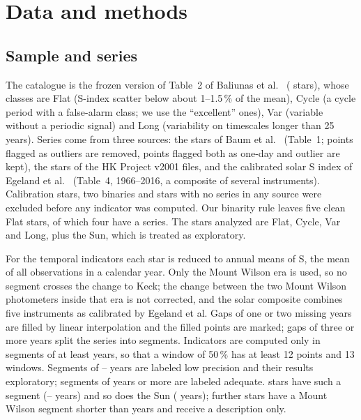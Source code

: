 \section{Data and methods}

\subsection{Sample and series}

The catalogue is the frozen version of Table~2 of Baliunas et al.\ \cite{baliunas1995} (\NCatalog{} stars), whose classes are Flat (S-index scatter below about 1--1.5\,\% of the mean), Cycle (a cycle period with a false-alarm class; we use the ``excellent'' ones), Var (variable without a periodic signal) and Long (variability on timescales longer than 25 years). Series come from three sources: the \NBaumStars{} stars of Baum et al.\ \cite{baum2022} (Table~1; points flagged as outliers are removed, points flagged both as one-day and outlier are kept), the \NVTwoStars{} stars of the HK Project v2001 files, and the calibrated solar S index of Egeland et al.\ \cite{egeland2017} (Table~4, 1966--2016, a composite of several instruments). Calibration stars, two binaries and stars with no series in any source were excluded before any indicator was computed. Our binarity rule leaves five clean Flat stars, of which four have a series. The stars analyzed are \NGroupFlat{} Flat, \NGroupCycle{} Cycle, \NGroupVar{} Var and \NGroupLong{} Long, plus the Sun, which is treated as exploratory.

For the temporal indicators each star is reduced to annual means of S, the mean of all observations in a calendar year. Only the Mount Wilson era is used, so no segment crosses the change to Keck; the change between the two Mount Wilson photometers inside that era is not corrected, and the solar composite combines five instruments as calibrated by Egeland et al. Gaps of one or two missing years are filled by linear interpolation and the filled points are marked; gaps of three or more years split the series into segments. Indicators are computed only in segments of at least \MinSeg{} years, so that a window of 50\,\% has at least 12 points and 13 windows. Segments of \MinSeg--\LowMax{} years are labeled low precision and their results exploratory; segments of \AdeqMin{} years or more are labeled adequate. \NStarsRun{} stars have such a segment (\LMin--\LMax{} years) and so does the Sun (\NSunYears{} years); \NNotRun{} further stars have a Mount Wilson segment shorter than \MinSeg{} years and receive a description only.

